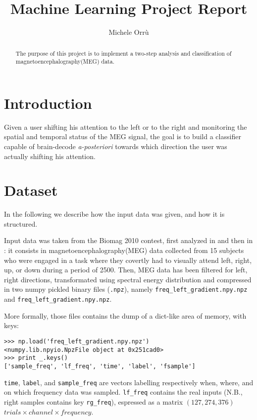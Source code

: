 \documentclass[10pt]{article}
\title{\textbf{Machine Learning Project Report }}
\author{Michele Orr\`u}
\begin{document}
\newcommand{\code}[1]{\texttt{#1}}
\maketitle
\begin{abstract}
The purpose of this project is to implement a two-step analysis and classification of magnetoencephalography(MEG) data. 
\end{abstract}


\section{Introduction}
Given a user shifting his attention to the left or to the right and monitoring the spatial and temporal status of the MEG\cite{Biomag2010} signal, the goal is to build a classifier capable of brain-decode \textit{a-posteriori} towards which direction the user was actually shifting his attention.



\section{Dataset}
\label{dataset}
In the following we describe how the input data was given, and how it is structured. 

\noindent
Input data was taken from the Biomag 2010 contest, first analyzed in 
\cite{Biomag2010} and then in \cite{Braindecoding}: it consists in
 magnetoencephalography(MEG) data collected from 15 subjects who were engaged in
a task where they covertly had to visually attend left, right, up, or down during a
period of 2500\milli\second. 
Then, MEG data has been filtered for left, right directions, transformated using spectral energy distribution and compressed in two numpy pickled binary files
 (\code{.npz}), namely \code{freq\_left\_gradient.npy.npz}
 and \code{freq\_left\_gradient.npy.npz}.

More formally, those files contains the dump of a dict-like area of memory, with keys:
\begin{verbatim}
>>> np.load('freq_left_gradient.npy.npz')
<numpy.lib.npyio.NpzFile object at 0x251cad0>
>>> print _.keys()
['sample_freq', 'lf_freq', 'time', 'label', 'fsample']
\end{verbatim}

\code{time}, \code{label}, and \code{sample\_freq} are vectors labelling respectively when, where, and on which frequency data was sampled.
\code{lf\_freq} contains the real inputs (N.B., right samples contains key \code{rg\_freq}), espressed as a matrix $(127, 274, 376)$ $trials \times channel \times frequency$.
\end{document}
